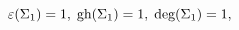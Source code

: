 \begin{equation}
\varepsilon(\Sigma_{1})=1,\;\hbox{gh}(\Sigma_{1})=1,\;\hbox{deg}
(\Sigma_{1})=1,\label{3.22}%
\end{equation}%

